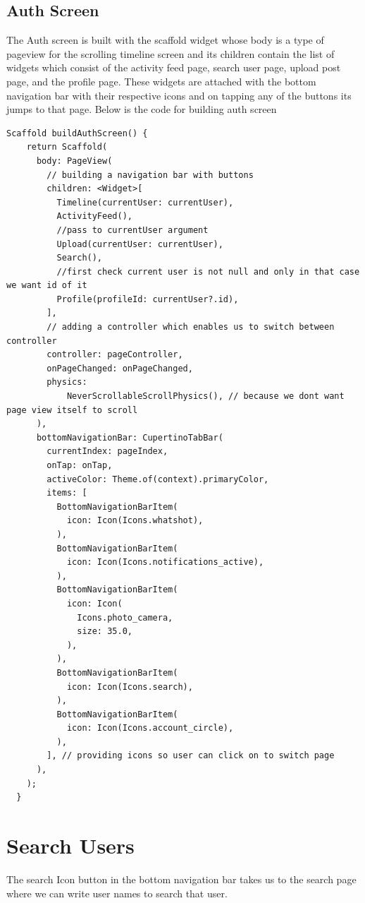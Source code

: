 \subsection{Auth Screen}
The Auth screen is built with the scaffold widget whose body is a type of pageview for the scrolling timeline screen and its children contain the list of widgets which consist of the activity feed page, search user page, upload post page, and the profile page. These widgets are attached with the bottom navigation bar with their respective icons and on tapping any of the buttons its jumps to that page. Below is the code for building auth screen

\begin{verbatim}
Scaffold buildAuthScreen() {
    return Scaffold(
      body: PageView(
        // building a navigation bar with buttons
        children: <Widget>[
          Timeline(currentUser: currentUser),
          ActivityFeed(),
          //pass to currentUser argument
          Upload(currentUser: currentUser),
          Search(),
          //first check current user is not null and only in that case we want id of it
          Profile(profileId: currentUser?.id),
        ],
        // adding a controller which enables us to switch between controller
        controller: pageController,
        onPageChanged: onPageChanged,
        physics:
            NeverScrollableScrollPhysics(), // because we dont want page view itself to scroll
      ),
      bottomNavigationBar: CupertinoTabBar(
        currentIndex: pageIndex,
        onTap: onTap,
        activeColor: Theme.of(context).primaryColor,
        items: [
          BottomNavigationBarItem(
            icon: Icon(Icons.whatshot),
          ),
          BottomNavigationBarItem(
            icon: Icon(Icons.notifications_active),
          ),
          BottomNavigationBarItem(
            icon: Icon(
              Icons.photo_camera,
              size: 35.0,
            ),
          ),
          BottomNavigationBarItem(
            icon: Icon(Icons.search),
          ),
          BottomNavigationBarItem(
            icon: Icon(Icons.account_circle),
          ),
        ], // providing icons so user can click on to switch page
      ),
    );
  }
\end{verbatim}

\section{Search Users}
The search Icon button in the bottom navigation bar takes us to the search page where we can write user names to search that user.
